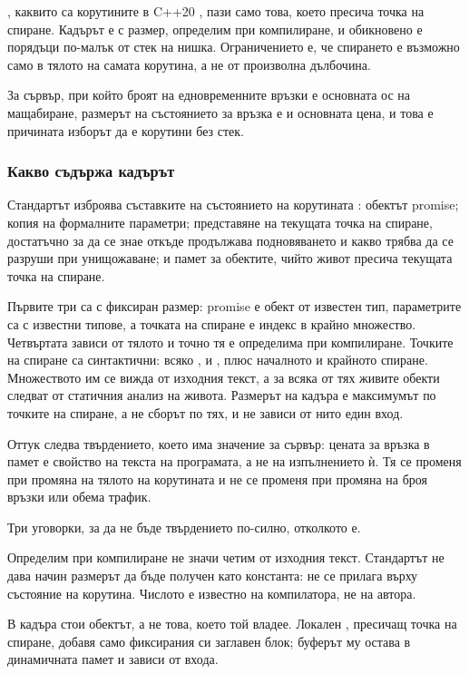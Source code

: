 , каквито са корутините в C++20 \cite{cpp20standard}, пази само
това, което пресича точка на спиране. Кадърът е с размер, определим при компилиране, и
обикновено е порядъци по-малък от стек на нишка. Ограничението е, че спирането е възможно
само в тялото на самата корутина, а не от произволна дълбочина.

За сървър, при който броят на едновременните връзки е основната ос на мащабиране, размерът на
състоянието за връзка е и основната цена, и това е причината изборът да е корутини без стек.

\subsubsection{Какво съдържа кадърът}

Стандартът изброява съставките на състоянието на корутината \cite{cpp20standard}: обектът
promise; копия на формалните параметри; представяне на текущата точка на спиране, достатъчно
за да се знае откъде продължава подновяването и какво трябва да се разруши при унищожаване;
и памет за обектите, чийто живот пресича текущата точка на спиране.

Първите три са с фиксиран размер: promise е обект от известен тип, параметрите са с известни
типове, а точката на спиране е индекс в крайно множество. Четвъртата зависи от тялото и точно
тя е определима при компилиране. Точките на спиране са синтактични: всяко ,
 и , плюс началното и крайното спиране. Множеството им се
вижда от изходния текст, а за всяка от тях живите обекти следват от статичния анализ на
живота. Размерът на кадъра е максимумът по точките на спиране, а не сборът по тях, и не
зависи от нито един вход.

Оттук следва твърдението, което има значение за сървър: цената за връзка в памет е свойство
на текста на програмата, а не на изпълнението ѝ. Тя се променя при промяна на тялото на
корутината и не се променя при промяна на броя връзки или обема трафик.

Три уговорки, за да не бъде твърдението по-силно, отколкото е.

Определим при компилиране не значи четим от изходния текст. Стандартът не дава начин размерът
да бъде получен като константа:  не се прилага върху състояние на корутина.
Числото е известно на компилатора, не на автора.

В кадъра стои обектът, а не това, което той владее. Локален , пресичащ
точка на спиране, добавя само фиксирания си заглавен блок; буферът му остава в динамичната
памет и зависи от входа.

